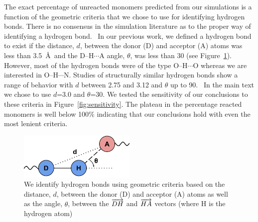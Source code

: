 \documentclass{article}
\begin{document}
  The exact percentage of unreacted monomers predicted from our simulations is a 
  function of the geometric criteria that we chose to use for identifying hydrogen bonds.
  There is no consensus in the simulation literature as to the proper way of identifying
  a hydrogen bond.~\cite{prada-gracia_quest_2013} In our previous work, we 
  defined a hydrogen bond to exist if the distance, $d$, between the donor (D) and acceptor (A)
  atoms was less than 3.5~\AA~and the D--H$\cdots$A angle, $\theta$, was less than 30\degree
  (see Figure~\ref{fig:hbond_geometry}).~\cite{coscia_chemically_2019} However, most
  of the hydrogen bonds were of the type O--H$\cdots$O whereas we are interested in
  O--H$\cdots$N. Studies of structurally similar hydrogen bonds show a range of 
  behavior with $d$ between 2.75 and 3.12 and $\theta$ up to 90\degree.~\cite{taylor_geometry_1984,haynes_hydrogen_2008}
  In the main text we chose to use $d$=3.0 and $\theta$=30\degree. We tested the 
  sensitivity of our conclusions to these criteria in Figure~\ref{fig:sensitivity}. 
  The plateau in the percentage reacted monomers is well below 100\% indicating that our
  conclusions hold with even the most lenient criteria.
  
  \begin{figure}
  \centering
  \includegraphics[width=0.5\textwidth]{hbond_geometry.pdf}
  \caption{We identify hydrogen bonds using geometric criteria based on
  the distance, $d$, between the donor (D) and acceptor (A) atoms as well
  as the angle, $\theta$, between the $\protect\overrightarrow{DH}$ and
  $\protect\overrightarrow{HA}$ vectors (where H is the hydrogen atom)}\label{fig:hbond_geometry}
  \end{figure}
  
\end{document}

